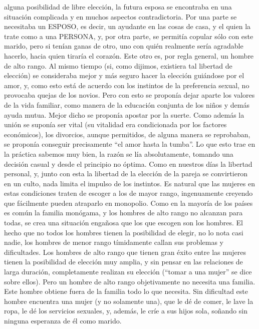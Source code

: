 alguna posibilidad de libre elección, la futura esposa se encontraba en
una situación complicada y en muchos aspectos contradictoria. Por una
parte se necesitaba un ESPOSO, es decir, un ayudante en las cosas de
casa, y el quien la trate como a una PERSONA, y, por otra parte, se
permitía copular sólo con este marido, pero si tenían ganas de otro, uno
con quién realmente sería agradable hacerlo, hacia quien tiraría el
corazón. Este otro es, por regla general, un hombre de alto rango. Al
mismo tiempo (si, como dijimos, existiera tal libertad de elección) se
consideraba mejor y más seguro hacer la elección guiándose por el amor,
y, como esto está de acuerdo con los instintos de la preferencia sexual,
no provocaba quejas de los novios. Pero con esto se proponía dejar
aparte los valores de la vida familiar, como manera de la educación
conjunta de los niños y demás ayuda mutua. Mejor dicho se proponía
apostar por la suerte. Como además la unión se suponía ser vital (su
vitalidad era condicionada por los factores económicos), los divorcios,
aunque permitidos, de alguna manera se reprobaban, se proponía conseguir
precisamente ``el amor hasta la tumba''. Lo que esto trae en la práctica
sabemos muy bien, la razón se lía absolutamente, tomando una decisión
casual y desde el principio no óptima. Como en nuestros días la libertad
personal, y, junto con esta la libertad de la elección de la pareja se
convirtieron en un culto, nada limita el impulso de los instintos. Es
natural que las mujeres en estas condiciones traten de escoger a los de
mayor rango, ingenuamente creyendo que fácilmente pueden atraparlo en
monopolio. Como en la mayoría de los países es común la familia
monógama, y los hombres de alto rango no alcanzan para todas, se crea
una situación engañosa que los que escogen son los hombres. El hecho que
no todos los hombres tienen la posibilidad de elegir, no lo nota casi
nadie, los hombres de menor rango tímidamente callan sus problemas y
dificultades. Los hombres de alto rango que tienen gran éxito entre las
mujeres tienen la posibilidad de elección muy amplia, y sin pensar en
las relaciones de larga duración, completamente realizan su elección
(``tomar a una mujer'' se dice sobre ellos). Pero un hombre de alto
rango objetivamente no necesita una familia. Este hombre obtiene fuera
de la familia todo lo que necesita. Sin dificultad este hombre encuentra
una mujer (y no solamente una), que le dé de comer, le lave la ropa, le
dé los servicios sexuales, y, además, le críe a sus hijos sola, soñando
sin ninguna esperanza de él como marido.\\
